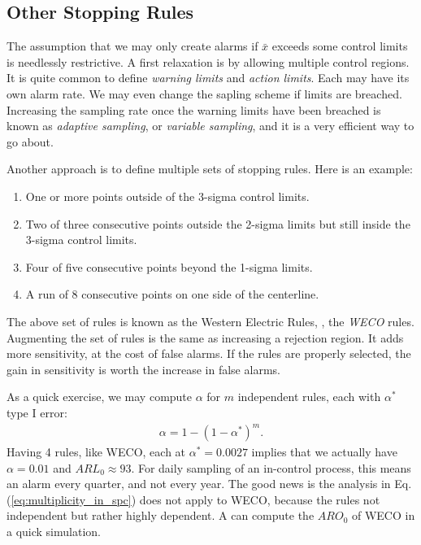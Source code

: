 \subsection{Other Stopping Rules}
\label{sec:stopping_rules}

The assumption that we may only create alarms if $\bar{x}$ exceeds some control limits is needlessly restrictive.
A first relaxation is by allowing multiple control regions.
It is quite common to define \emph{warning limits} and \emph{action limits}. Each may have its own alarm rate.
We may even change the sapling scheme if limits are breached. Increasing the sampling rate once the warning limits have been breached is known as \emph{adaptive sampling}, or \emph{variable sampling}, and it is a very efficient way to go about. 



Another approach is to define multiple sets of stopping rules.
Here is an example:
\begin{enumerate}
\item One or more points outside of the 3-sigma control limits.
\item Two of three consecutive points outside the 2-sigma limits but still inside the 3-sigma control limits.
\item Four of five consecutive points beyond the 1-sigma limits.
\item A run of 8 consecutive points on one side of the centerline.
\end{enumerate}
The above set of rules is known as the Western Electric Rules, \aka, the \emph{WECO} rules.
Augmenting the set of rules is the same as increasing a rejection region. It adds more sensitivity, at the cost of false alarms. If the rules are properly selected, the gain in sensitivity is worth the increase in false alarms.

As a quick exercise, we may compute $\alpha$  for $m$ independent rules, each with $\alpha^*$ type I error:
\begin{align}
\label{eq:multiplicity_in_spc}
	\alpha=1-(1-\alpha^*)^m.
\end{align}
Having 4 rules, like WECO, each at $\alpha^*=0.0027$ implies that we actually have $\alpha=0.01$ and $ARL_0 \approx 93$. For daily sampling of an in-control process, this means an alarm every quarter, and not every year. 
The good news is the analysis in Eq.(\ref{eq:multiplicity_in_spc}) does not apply to WECO, because the rules not independent but rather highly dependent. 
A can compute the $ARO_0$ of WECO in a quick simulation.


